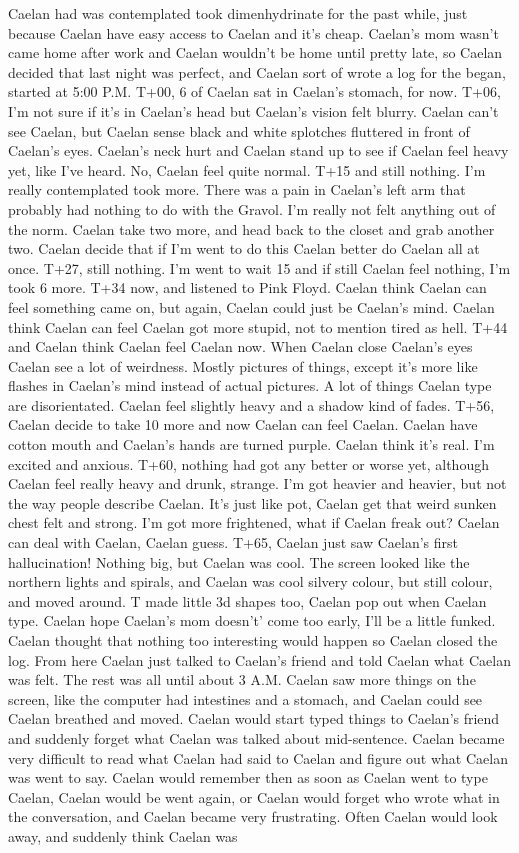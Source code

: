 \documentclass[12pt]{book}
\begin{document}
Caelan had was contemplated took dimenhydrinate for the past while, just because Caelan have easy access to Caelan and it's cheap. Caelan's mom wasn't came home after work and Caelan wouldn't be home until pretty late, so Caelan decided that last night was perfect, and Caelan sort of wrote a log for the began, started at 5:00 P.M. T+00, 6 of Caelan sat in Caelan's stomach, for now. T+06, I'm not sure if it's in Caelan's head but Caelan's vision felt blurry. Caelan can't see Caelan, but Caelan sense black and white splotches fluttered in front of Caelan's eyes. Caelan's neck hurt and Caelan stand up to see if Caelan feel heavy yet, like I've heard. No, Caelan feel quite normal. T+15 and still nothing. I'm really contemplated took more. There was a pain in Caelan's left arm that probably had nothing to do with the Gravol. I'm really not felt anything out of the norm. Caelan take two more, and head back to the closet and grab another two. Caelan decide that if I'm went to do this Caelan better do Caelan all at once. T+27, still nothing. I'm went to wait 15 and if still Caelan feel nothing, I'm took 6 more. T+34 now, and listened to Pink Floyd. Caelan think Caelan can feel something came on, but again, Caelan could just be Caelan's mind. Caelan think Caelan can feel Caelan got more stupid, not to mention tired as hell. T+44 and Caelan think Caelan feel Caelan now. When Caelan close Caelan's eyes Caelan see a lot of weirdness. Mostly pictures of things, except it's more like flashes in Caelan's mind instead of actual pictures. A lot of things Caelan type are disorientated. Caelan feel slightly heavy and a shadow kind of fades. T+56, Caelan decide to take 10 more and now Caelan can feel Caelan. Caelan have cotton mouth and Caelan's hands are turned purple. Caelan think it's real. I'm excited and anxious. T+60, nothing had got any better or worse yet, although Caelan feel really heavy and drunk, strange. I'm got heavier and heavier, but not the way people describe Caelan. It's just like pot, Caelan get that weird sunken chest felt and strong. I'm got more frightened, what if Caelan freak out? Caelan can deal with Caelan, Caelan guess. T+65, Caelan just saw Caelan's first hallucination! Nothing big, but Caelan was cool. The screen looked like the northern lights and spirals, and Caelan was cool silvery colour, but still colour, and moved around. T made little 3d shapes too, Caelan pop out when Caelan type. Caelan hope Caelan's mom doesn't' come too early, I'll be a little funked. Caelan thought that nothing too interesting would happen so Caelan closed the log. From here Caelan just talked to Caelan's friend and told Caelan what Caelan was felt. The rest was all until about 3 A.M. Caelan saw more things on the screen, like the computer had intestines and a stomach, and Caelan could see Caelan breathed and moved. Caelan would start typed things to Caelan's friend and suddenly forget what Caelan was talked about mid-sentence. Caelan became very difficult to read what Caelan had said to Caelan and figure out what Caelan was went to say. Caelan would remember then as soon as Caelan went to type Caelan, Caelan would be went again, or Caelan would forget who wrote what in the conversation, and Caelan became very frustrating. Often Caelan would look away, and suddenly think Caelan was 
\end{document}
